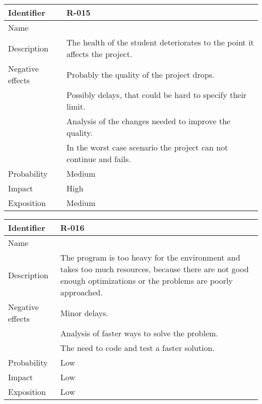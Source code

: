 \begin{table}[H]
	\begin{tabularx}{\textwidth}{|l|X|}
		\hline
		\rowcolor{gray!30}
		Identifier & \textbf{R-015} \\ \hline
		Name & \Rquince \\ \hline
		Description & The health of the student deteriorates to the point it affects the project.\\ \hline
		Negative effects
			& Probably the quality of the project drops. \\
			& Possibly delays, that could be hard to specify their limit. \\
			& Analysis of the changes needed to improve the quality. \\
			& In the worst case scenario the project can not continue and fails. \\ \hline
		Probability & Medium\\ \hline
		Impact &  High\\ \hline
		Exposition &  Medium\\ \hline
	\end{tabularx}
\end{table}

\begin{table}[H]
	\begin{tabularx}{\textwidth}{|l|X|}
		\hline
		\rowcolor{gray!30}
		Identifier & \textbf{R-016} \\ \hline
		Name & \Rdieciseis \\ \hline
		Description & The program is too heavy for the environment and takes too much resources, because there are not good enough optimizations or the problems are poorly approached.\\ \hline
		Negative effects
			& Minor delays. \\
			& Analysis of faster ways to solve the problem.\\
			& The need to code and test a faster solution.\\ \hline
		Probability & Low\\ \hline
		Impact &  Low\\ \hline
		Exposition &  Low\\ \hline
	\end{tabularx}
\end{table}

